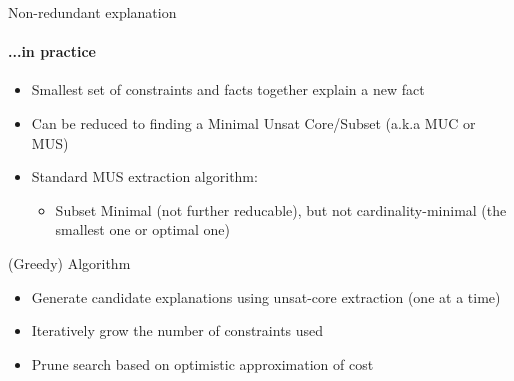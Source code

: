 \documentclass{beamer}
\begin{document}
\begin{frame}{Non-redundant explanation}
    \framesubtitle{...in practice}

    \begin{itemize}
        \item Smallest set of constraints and facts together explain a new fact
        \item Can be reduced to finding a Minimal Unsat Core/Subset (a.k.a MUC or MUS)
        \item Standard MUS extraction algorithm:
              \begin{itemize}
                  \item Subset Minimal (not further reducable), but not cardinality-minimal (the smallest one or optimal one)
              \end{itemize}
    \end{itemize}
\end{frame}

\begin{frame}{(Greedy) Algorithm}

    \begin{itemize}
            \item Generate candidate explanations using unsat-core extraction (one at a time)
            \item Iteratively grow the number of constraints used
            \item Prune search based on optimistic approximation of cost
    \end{itemize}
 
\end{frame}
\end{document}
